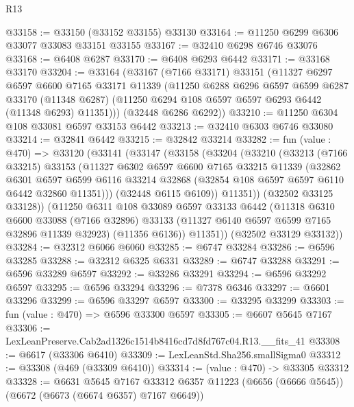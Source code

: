 \begin{lexlean}{R13}
\begin{coremodule}
@33158 := @33150 (@33152 @33155) @33130
@33164 := @11250 @6299 @6306 @33077 @33083 @33151 @33155
@33167 := @32410 @6298 @6746 @33076
@33168 := @6408 @6287
@33170 := @6408 @6293 @6442
@33171 := @33168 @33170
@33204 := @33164
    (@33167
      (@7166 @33171)
      @33151
      (@11327
        @6297
        @6597
        @6600
        @7165
        @33171
        @11339
        (@11250
          @6288
          @6296
          @6597
          @6599
          @6287
          @33170
          (@11348 @6287)
          (@11250 @6294 @108 @6597 @6597 @6293 @6442 (@11348 @6293) @11351)))
      (@32448 @6286 @6292))
@33210 := @11250 @6304 @108 @33081 @6597 @33153 @6442
@33213 := @32410 @6303 @6746 @33080
@33214 := @32841 @6442
@33215 := @32842 @33214
@33282 := fun (value : @470) =>
  @33120
    (@33141
      (@33147
        (@33158
          (@33204
            (@33210
              (@33213
                (@7166 @33215)
                @33153
                (@11327
                  @6302
                  @6597
                  @6600
                  @7165
                  @33215
                  @11339
                  (@32862
                    @6301
                    @6597
                    @6599
                    @6116
                    @33214
                    @32868
                    (@32854 @108 @6597 @6597 @6110 @6442 @32860 @11351)))
                (@32448 @6115 @6109))
              @11351))
          (@32502 @33125 @33128))
        (@11250
          @6311
          @108
          @33089
          @6597
          @33133
          @6442
          (@11318
            @6310
            @6600
            @33088
            (@7166 @32896)
            @33133
            (@11327 @6140 @6597 @6599 @7165 @32896 @11339 @32923)
            (@11356 @6136))
          @11351))
      (@32502 @33129 @33132))
@33284 := @32312 @6066 @6060
@33285 := @6747 @33284
@33286 := @6596 @33285
@33288 := @32312 @6325 @6331
@33289 := @6747 @33288
@33291 := @6596 @33289 @6597
@33292 := @33286 @33291
@33294 := @6596 @33292 @6597
@33295 := @6596 @33294
@33296 := @7378 @6346
@33297 := @6601 @33296
@33299 := @6596 @33297 @6597
@33300 := @33295 @33299
@33303 := fun (value : @470) => @6596 @33300 @6597
@33305 := @6607 @5645 @7167
@33306 := LexLeanPreserve.Cab2ad1326c1514b8416cd7d8fd767c04.R13.__fits_41
@33308 := @6617 (@33306 @6410)
@33309 := LexLeanStd.Sha256.smallSigma0
@33312 := @33308 (@469 (@33309 @6410))
@33314 := (value : @470) -> @33305 @33312
@33328 := @6631
    @5645
    @7167
    @33312
    @6357
    @11223
    (@6656 (@6666 @5645))
    (@6672 (@6673 (@6674 @6357) @7167 @6649))

\end{coremodule}
\end{lexlean}
